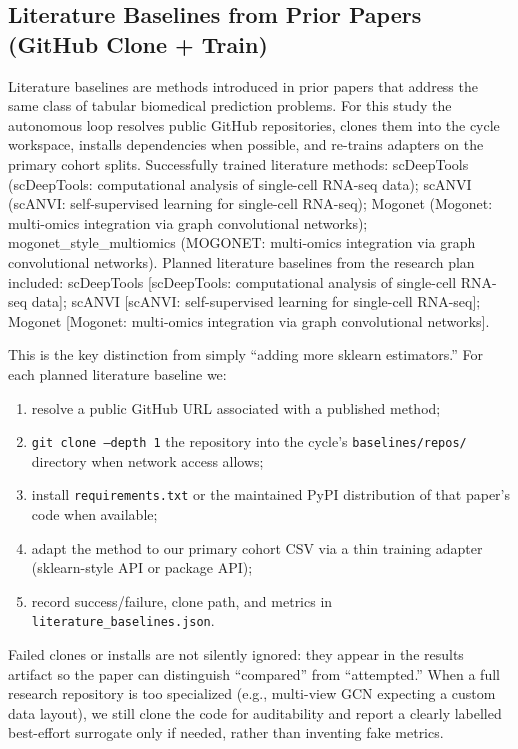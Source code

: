 \documentclass[10pt,journal]{IEEEtran}
\begin{document}
\subsection{Literature Baselines from Prior Papers (GitHub Clone + Train)}
Literature baselines are methods introduced in prior papers that address the same class of tabular biomedical prediction problems. For this study the autonomous loop resolves public GitHub repositories, clones them into the cycle workspace, installs dependencies when possible, and re-trains adapters on the primary cohort splits. Successfully trained literature methods: scDeepTools (scDeepTools: computational analysis of single-cell RNA-seq data); scANVI (scANVI: self-supervised learning for single-cell RNA-seq); Mogonet (Mogonet: multi-omics integration via graph convolutional networks); mogonet\_style\_multiomics (MOGONET: multi-omics integration via graph convolutional networks). Planned literature baselines from the research plan included: scDeepTools [scDeepTools: computational analysis of single-cell RNA-seq data]; scANVI [scANVI: self-supervised learning for single-cell RNA-seq]; Mogonet [Mogonet: multi-omics integration via graph convolutional networks].

This is the key distinction from simply ``adding more sklearn estimators.'' For each planned
literature baseline we:
\begin{enumerate}
\item resolve a public GitHub URL associated with a published method;
\item \texttt{git clone --depth 1} the repository into the cycle's \texttt{baselines/repos/}
directory when network access allows;
\item install \texttt{requirements.txt} or the maintained PyPI distribution of that paper's
code when available;
\item adapt the method to our primary cohort CSV via a thin training adapter (sklearn-style
API or package API);
\item record success/failure, clone path, and metrics in \texttt{literature\_baselines.json}.
\end{enumerate}
Failed clones or installs are not silently ignored: they appear in the results artifact so
the paper can distinguish ``compared'' from ``attempted.'' When a full research repository is
too specialized (e.g., multi-view GCN expecting a custom data layout), we still clone the code
for auditability and report a clearly labelled best-effort surrogate only if needed, rather
than inventing fake metrics.
\end{document}
